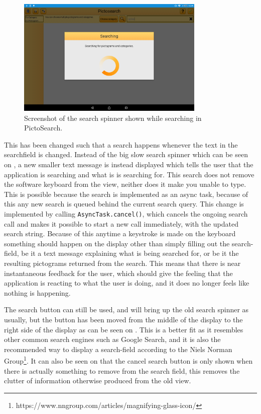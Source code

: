 \begin{figure}[h]
    \centering
    \includegraphics[width=0.8\textwidth]{figures/img/screenshots/old_dialog.png}
    \caption{Screenshot of the search spinner shown while searching in PictoSearch.}\label{fig:screenshot_searchspinner}
\end{figure}
This has been changed such that a search happens whenever the text in the searchfield is changed.
Instead of the big slow search spinner which can be seen on , a new smaller text message is instead displayed which tells the user that the application is searching and what is is searching for. 
This search does not remove the software keyboard from the view, neither does it make you unable to type.
This is possible because the search is implemented as an async task, because of this any new search is queued behind the current search query.
This change is implemented by calling \texttt{AsyncTask.cancel()}, which cancels the ongoing search call and makes it possible to start a new call immediately, with the updated search string.
Because of this anytime a keystroke is made on the keyboard something should happen on the display other than simply filling out the search-field, be it a text message explaining what is being searched for, or be it the resulting pictograms returned from the search.
This means that there is near instantaneous feedback for the user, which should give the feeling that the application is reacting to what the user is doing, and it does no longer feels like nothing is happening.

The search button can still be used, and will bring up the old search spinner as usually, but the button has been moved from the middle of the display to the right side of the display as can be seen on .
This is a better fit as it resembles other common search engines such as Google Search, and it is also the recommended way to display a search-field according to the Niels Norman Group\footnote{https://www.nngroup.com/articles/magnifying-glass-icon/}.
It can also be seen on  that the cancel search button is only shown when there is actually something to remove from the search field, this removes the clutter of information otherwise produced from the old view.

